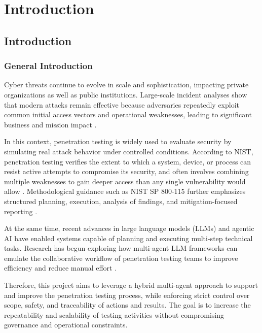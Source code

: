 \part{Introduction}

\chapter{Introduction}
\section{General Introduction}

Cyber threats continue to evolve in scale and sophistication, impacting private organizations as well as public institutions.
Large-scale incident analyses show that modern attacks remain effective because adversaries repeatedly exploit common
initial access vectors and operational weaknesses, leading to significant business and mission impact \cite{verizonDBIR2025}.

In this context, penetration testing is widely used to evaluate security by simulating real attack behavior under controlled
conditions. According to NIST, penetration testing verifies the extent to which a system, device, or process can resist active
attempts to compromise its security, and often involves combining multiple weaknesses to gain deeper access than any single
vulnerability would allow \cite{nistPenTest,nistSmallBizGlossary}. Methodological guidance such as NIST SP 800-115 further
emphasizes structured planning, execution, analysis of findings, and mitigation-focused reporting \cite{nistSP800115}.

At the same time, recent advances in large language models (LLMs) and agentic AI have enabled systems capable of planning and
executing multi-step technical tasks. Research has begun exploring how multi-agent LLM frameworks can emulate the collaborative
workflow of penetration testing teams to improve efficiency and reduce manual effort \cite{vulnbot}.

Therefore, this project aims to leverage a hybrid multi-agent approach to support and improve the penetration testing process,
while enforcing strict control over scope, safety, and traceability of actions and results. The goal is to increase the
repeatability and scalability of testing activities without compromising governance and operational constraints.
\lipsum[1] \\
